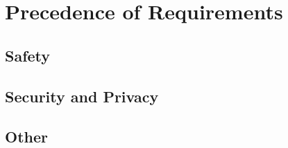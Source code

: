 \KNEADSECTIONNEWPAGE
\section{Precedence of Requirements}
\label{lab:sec_Precedence}
% 

\KNEADSUBSECTIONNEWPAGE
\subsection{Safety}
\label{lab:ssec_Precedence_Safety}




\KNEADSUBSECTIONNEWPAGE
\subsection{Security and Privacy}
\label{lab:ssec_Precedence_SecurityAndPrivacy}



\KNEADSUBSECTIONNEWPAGE
\subsection{Other}
\label{lab:ssec_Precedence_Other}



